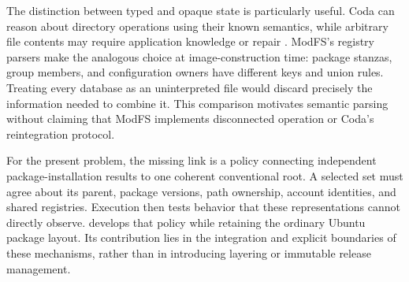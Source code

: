 The distinction between typed and opaque state is particularly useful. Coda can reason about directory operations using their known semantics, while arbitrary file contents may require application knowledge or repair \autocite{satyanarayanan1990coda,kistler1992disconnected}. ModFS's registry parsers make the analogous choice at image-construction time: package stanzas, group members, and configuration owners have different keys and union rules. Treating every database as an uninterpreted file would discard precisely the information needed to combine it. This comparison motivates semantic parsing without claiming that ModFS implements disconnected operation or Coda's reintegration protocol.

For the present problem, the missing link is a policy connecting independent package-installation results to one coherent conventional root. A selected set must agree about its parent, package versions, path ownership, account identities, and shared registries. Execution then tests behavior that these representations cannot directly observe.  develops that policy while retaining the ordinary Ubuntu package layout. Its contribution lies in the integration and explicit boundaries of these mechanisms, rather than in introducing layering or immutable release management.

